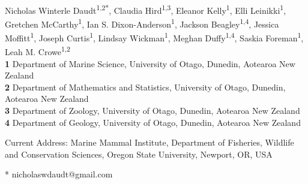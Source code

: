 \documentclass[10pt,letterpaper]{article}
\begin{document}
\vspace*{0.2in}

\begin{flushleft}
{\Large
\textbf{}
}
\newline
\\
Nicholas Winterle Daudt\textsuperscript{1,2*},
Claudia Hird\textsuperscript{1,3},
Eleanor Kelly\textsuperscript{1},
Elli Leinikki\textsuperscript{1},
Gretchen McCarthy\textsuperscript{1},
Ian S. Dixon-Anderson\textsuperscript{1},
Jackson Beagley\textsuperscript{1,4},
Jessica Moffitt\textsuperscript{1},
Joseph Curtis\textsuperscript{1},
Lindsay Wickman\textsuperscript{1\textcurrency},
Meghan Duffy\textsuperscript{1,4},
Saskia Foreman\textsuperscript{1},
Leah M. Crowe\textsuperscript{1,2}
\\
\bigskip
\textbf{1} Department of Marine Science, University of Otago, Dunedin, Aotearoa New Zealand
\\
\textbf{2} Department of Mathematics and Statistics, University of Otago, Dunedin, Aotearoa New Zealand
\\
\textbf{3} Department of Zoology, University of Otago, Dunedin, Aotearoa New Zealand
\\
\textbf{4} Department of Geology, University of Otago, Dunedin, Aotearoa New Zealand
\\
\bigskip

% 
%


\textcurrency Current Address: Marine Mammal Institute, Department of Fisheries, Wildlife and Conservation Sciences, Oregon State University, Newport, OR, USA 

* nicholaswdaudt@gmail.com 

\end{flushleft}
\end{document}
